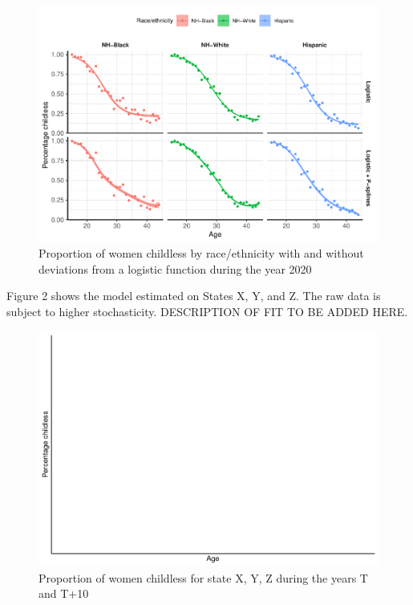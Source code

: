 \documentclass[
  11pt,
  letterpaper,
]{article}
\begin{document}
\begin{figure}[H]
\includegraphics{childlessness_paa_ext_abstract_files/figure-latex/race-fit-1} \caption{Proportion of women childless by race/ethnicity with and without deviations from a logistic function during the year 2020}\label{fig:race-fit}
\end{figure}

Figure 2 shows the model estimated on States X, Y, and Z. The raw data is subject to higher stochasticity. DESCRIPTION OF FIT TO BE ADDED HERE.

\begin{figure}[H]
\includegraphics{childlessness_paa_ext_abstract_files/figure-latex/state-fit-1} \caption{Proportion of women childless for state X, Y, Z during the years T and T+10}\label{fig:state-fit}
\end{figure}
\end{document}
